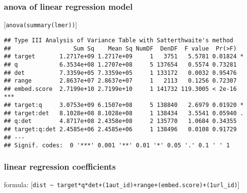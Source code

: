 \documentclass[
  12pt,
  oneside]{book}
\begin{document}
\subsubsection{anova of linear regression model}\label{anova-of-linear-regression-model-1}

{[}\texttt{anova(summary(lmer))}{]}

\begin{verbatim}
## Type III Analysis of Variance Table with Satterthwaite's method
##                  Sum Sq    Mean Sq NumDF  DenDF  F value  Pr(>F)    
## target       1.2717e+09 1.2717e+09     1   3751   5.5781 0.01824 *  
## q            6.3534e+08 1.2707e+08     5 137654   0.5574 0.73281    
## det          7.3359e+05 7.3359e+05     1 133172   0.0032 0.95476    
## range        2.8637e+07 2.8637e+07     1   2113   0.1256 0.72307    
## embed.score  2.7199e+10 2.7199e+10     1 141732 119.3005 < 2e-16 ***
## target:q     3.0753e+09 6.1507e+08     5 138840   2.6979 0.01920 *  
## target:det   8.1028e+08 8.1028e+08     1 138434   3.5541 0.05940 .  
## q:det        4.8717e+08 2.4358e+08     2 135770   1.0684 0.34355    
## target:q:det 2.4585e+06 2.4585e+06     1 138496   0.0108 0.91729    
## ---
## Signif. codes:  0 '***' 0.001 '**' 0.01 '*' 0.05 '.' 0.1 ' ' 1
\end{verbatim}

\subsubsection{linear regression coefficients}\label{linear-regression-coefficients-1}

formula: {[}\texttt{dist\ \textasciitilde{}\ target*q*det+(1\textbar{}aut\_id)+range+(embed.score)+(1\textbar{}url\_id)}{]}
\end{document}
